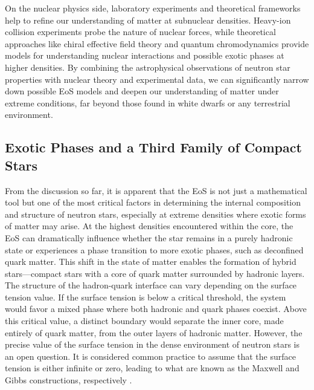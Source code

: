 \documentclass[main.tex]{subfiles}
\begin{document}
    On the nuclear physics side, laboratory experiments and theoretical frameworks help to refine our understanding of matter at subnuclear densities. Heavy-ion collision experiments probe the nature of nuclear forces, while theoretical approaches like chiral effective field theory and quantum chromodynamics provide models for understanding nuclear interactions and possible exotic phases at higher densities. By combining the astrophysical observations of neutron star properties with nuclear theory and experimental data, we can significantly narrow down possible EoS models and deepen our understanding of matter under extreme conditions, far beyond those found in white dwarfs or any terrestrial environment.

    \newpage
    \subsection{Exotic Phases and a Third Family of Compact Stars}

    From the discussion so far, it is apparent that the EoS is not just a mathematical tool but one of the most critical factors in determining the internal composition and structure of neutron stars, especially at extreme densities where exotic forms of matter may arise. At the highest densities encountered within the core, the EoS can dramatically influence whether the star remains in a purely hadronic state or experiences a phase transition to more exotic phases, such as deconfined quark matter. This shift in the state of matter enables the formation of hybrid stars---compact stars with a core of quark matter surrounded by hadronic layers. The structure of the hadron-quark interface can vary depending on the surface tension value. If the surface tension is below a critical threshold, the system would favor a mixed phase where both hadronic and quark phases coexist. Above this critical value, a distinct boundary would separate the inner core, made entirely of quark matter, from the outer layers of hadronic matter. However, the precise value of the surface tension in the dense environment of neutron stars is an open question. It is considered common practice to assume that the surface tension is either infinite or zero, leading to what are known as the Maxwell and Gibbs constructions, respectively \citep{PhysRevD.109.063022}.
\end{document}
